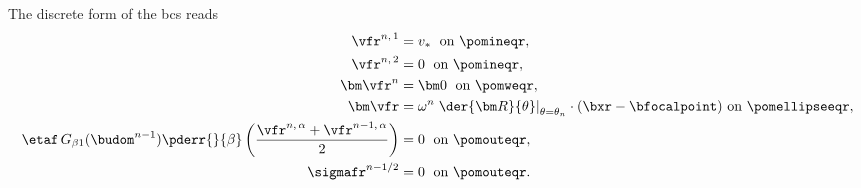 The discrete form of the \acp{bc}  reads
\bw
\begin{align}
    \label{bc_fl_rigid_1_reference_disc}
    \vfr^{n, \, 1}                                                                                                        & = v_\ast \; \text{ on }\pomineqr,                                                                                                         \\
    \label{bc_fl_rigid_2_reference_disc}
    \vfr^{n, \, 2}                                                                                                        & =  0 \; \text{ on } \pomineqr ,                                                                                                           \\
    \label{bc_fl_rigid_3_reference_disc}
    {\bm \vfr}^n                                                                                                          & = {\bm 0} \; \text{ on } \pomweqr ,                                                                                                       \\
    \label{bc_fl_rigid_4_reference_disc}
    {\bm \vfr}                                                                                                            & =
    \omega^n  \left. \der{{\bm R}}{\theta} \right|_{\theta = \theta_n} \cdot (\bxr - \bfocalpoint)  \text{ on } \pomellipseeqr ,                                                                                                                                      \\
    \label{bc_fl_rigid_5_reference_disc}
    \etaf \, G_{\beta 1}(\budom^{n-1}) \pderr{}{\beta}\left( \frac{\vfr^{n, \, \alpha} + \vfr^{n-1, \, \alpha}}{2}\right) & = 0                                                                                                           \; \text{ on } \pomouteqr , \\
    \label{bc_fl_rigid_6_reference_disc}
    \sigmafr^{n-1/2}                                                                                                      & = 0 \; \text{ on } \pomouteqr.
\end{align}
\ew

